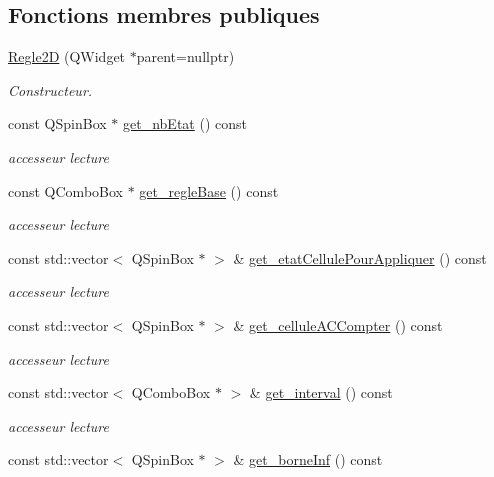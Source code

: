 \subsection*{Fonctions membres publiques}
\begin{DoxyCompactItemize}
\item 
\hyperlink{class_regle2_d_a21a799e32774f6cc50183a04422498e4}{Regle2D} (Q\+Widget $\ast$parent=nullptr)
\begin{DoxyCompactList}\small\item\em Constructeur. \end{DoxyCompactList}\item 
const Q\+Spin\+Box $\ast$ \hyperlink{class_regle2_d_abce7ef62aa852352d77ce8f88d5f05b6}{get\+\_\+nb\+Etat} () const 
\begin{DoxyCompactList}\small\item\em accesseur lecture \end{DoxyCompactList}\item 
const Q\+Combo\+Box $\ast$ \hyperlink{class_regle2_d_a25aba2d5c2d9acff7f433e35cb048504}{get\+\_\+regle\+Base} () const 
\begin{DoxyCompactList}\small\item\em accesseur lecture \end{DoxyCompactList}\item 
const std\+::vector$<$ Q\+Spin\+Box $\ast$ $>$ \& \hyperlink{class_regle2_d_a78534b72823ef634bf49d5f0f9db77f6}{get\+\_\+etat\+Cellule\+Pour\+Appliquer} () const 
\begin{DoxyCompactList}\small\item\em accesseur lecture \end{DoxyCompactList}\item 
const std\+::vector$<$ Q\+Spin\+Box $\ast$ $>$ \& \hyperlink{class_regle2_d_a7659287a9161902d50ac2e92c89919e6}{get\+\_\+cellule\+A\+C\+Compter} () const 
\begin{DoxyCompactList}\small\item\em accesseur lecture \end{DoxyCompactList}\item 
const std\+::vector$<$ Q\+Combo\+Box $\ast$ $>$ \& \hyperlink{class_regle2_d_a16721b0251aaedbac6b25dc840bc3aad}{get\+\_\+interval} () const 
\begin{DoxyCompactList}\small\item\em accesseur lecture \end{DoxyCompactList}\item 
const std\+::vector$<$ Q\+Spin\+Box $\ast$ $>$ \& \hyperlink{class_regle2_d_af9719a1cd616a23bbdb3271626161aee}{get\+\_\+borne\+Inf} () const 

\end{DoxyCompactItemize}
